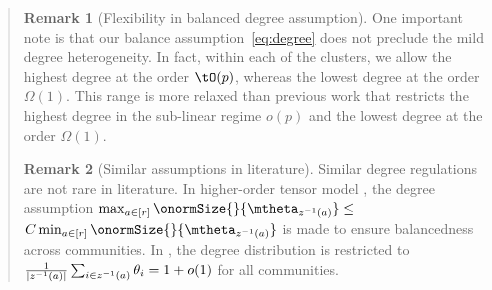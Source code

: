 \documentclass[11pt]{article}
\theoremstyle{definition}
\theoremstyle{definition}
\newtheorem{rmk}{Remark}
\begin{document}
\begin{enumerate}[wide, labelwidth=!, labelindent=0pt]
\begin{enumerate}
\begin{quote}
\begin{rmk}[Flexibility in balanced degree assumption] One important note is that our balance assumption~\eqref{eq:degree} does not preclude the mild degree heterogeneity. In fact, within each of the clusters, we allow the highest degree at the order $\tO(p)$, whereas the lowest degree at the order $\Omega(1)$. This range is more relaxed than previous work \citep{gao2018community} that restricts the highest degree in the sub-linear regime $o(p)$ and the lowest degree at the order $\Omega(1)$. 
\end{rmk}

\begin{rmk}[Similar assumptions in literature]
Similar degree regulations are not rare in literature. In higher-order tensor model \citep{ke2019community}, the degree assumption $\max_{a\in[r]} \onormSize{}{\mtheta_{z^{-1}(a)}} \leq $ $ C \min_{a\in[r]}\onormSize{}{\mtheta_{z^{-1}(a)}}$ is made to ensure balancedness across communities. %
In \cite{gao2018community}, the degree distribution is restricted to ${1\over |z^{-1}(a)|}\sum_{i\in z^{-1}(a)}\theta_i=1+o(1)$ for all communities. 
\end{rmk}

    \end{quote}
    
\end{enumerate}





\end{enumerate}
\end{document}
